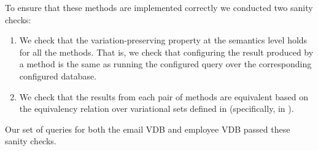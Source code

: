 To ensure that these methods are implemented correctly we conducted two
sanity checks:
\begin{enumerate}
\item We check that the variation-preserving property at the semantics level
holds for all the methods. That is, we check that configuring the result produced by
a method is the same as running the configured query over the corresponding 
configured database.
%
\item We check that the results from each pair of methods are equivalent based on
the equivalency relation over variational sets defined in  
(specifically, in ).
\end{enumerate}

Our set of queries for both the email VDB and employee VDB passed these sanity checks.
